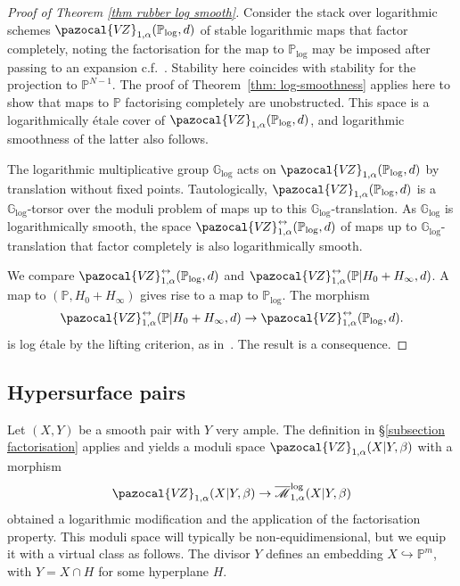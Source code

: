 \documentclass[11pt]{amsart}
\newcommand{\PP}{\mathbb P}
\newcommand{\VZ}{\pazocal{V\!Z}}
\renewcommand{\to}{\rightarrow}
\newcommand{\Glog}{\mathbb{G}_{\mathrm{log}}}
\newcommand{\Mcal}{\mathcal{M}}
\newcommand{\ol}[1]{\overline{#1}}
\theoremstyle{definition}
\theoremstyle{definition}
\begin{document}
\begin{proof}[Proof of Theorem \ref{thm rubber log smooth}]
Consider the stack over logarithmic schemes $\VZ_{1,\alpha}(\mathbb P_{\mathrm{log}},d)$ of stable logarithmic maps that factor completely, noting the factorisation for the map to $\mathbb P_{\mathrm{log}}$ may be imposed after passing to an expansion c.f.~\cite[Section~3.3]{RSPW2}. Stability here coincides with stability for the projection to $\mathbb P^{N-1}$. The proof of Theorem~\ref{thm: log-smoothness} applies here to show that maps to $\mathbb P$ factorising completely are unobstructed. This space is a logarithmically \'etale cover of $\VZ_{1,\alpha}(\mathbb P_{\mathrm{log}},d)$, and logarithmic smoothness of the latter also follows.

The logarithmic multiplicative group $\mathbb G_{\mathrm{log}}$ acts on $\VZ_{1,\alpha}(\mathbb P_{\mathrm{log}},d)$ by translation without fixed points. Tautologically, $\VZ_{1,\alpha}(\mathbb P_{\mathrm{log}},d)$ is a $\mathbb G_{\mathrm{log}}$-torsor over the moduli problem of maps up to this $\mathbb G_{\mathrm{log}}$-translation. As $\mathbb G_{\mathrm{log}}$ is logarithmically smooth, the space $\VZ^{\leftrightarrow}_{1,\alpha}(\mathbb P_{\mathrm{log}},d)$ of maps up to $\Glog$-translation that factor completely is also logarithmically smooth. 

We compare $\VZ^{\leftrightarrow}_{1,\alpha}(\mathbb P_{\mathrm{log}},d)$ and  $\VZ^{\leftrightarrow}_{1,\alpha}(\mathbb P|H_0+H_\infty,d)$. A map to $(\mathbb P,H_0+H_\infty)$ gives rise to a map to $\mathbb P_{\mathrm{log}}$. The morphism
\[
\VZ^{\leftrightarrow}_{1,\alpha}(\mathbb P|H_0+H_\infty,d)\to \VZ^{\leftrightarrow}_{1,\alpha}(\mathbb P_{\mathrm{log}},d).
\]
is log \'etale by the lifting criterion, as in~\cite[Theorem~5.3.4]{MW17}. The result is a consequence. 
\end{proof}

\subsection{Hypersurface pairs}\label{subsection virtual}
Let $(X,Y)$ be a smooth pair with $Y$ very ample. The definition in \S \ref{subsection factorisation} applies and yields a moduli space $\VZ_{1,\alpha}(X|Y,\beta)$ with a morphism
\begin{equation*} \VZ_{1,\alpha}(X|Y,\beta) \to \ol\Mcal^{\operatorname{log}}_{1,\alpha}(X|Y,\beta)\end{equation*}
obtained a logarithmic modification and the application of the factorisation property. This moduli space will typically be non-equidimensional, but we equip it with a virtual class as follows. The divisor $Y$ defines an embedding $X \hookrightarrow \PP^m$, with $Y=X\cap H$ for some hyperplane $H$.
\end{document}
